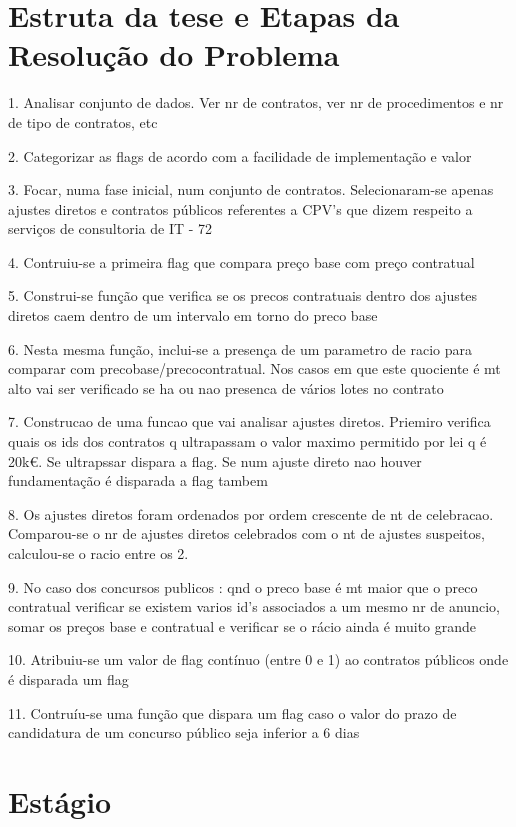 \section{Estruta da tese e   Etapas da Resolução do Problema}

1. Analisar conjunto de dados. Ver nr de contratos, ver nr de procedimentos e nr de tipo de contratos, etc

2. Categorizar as flags de acordo com a facilidade de implementação e valor

3. Focar, numa fase inicial, num conjunto de contratos. Selecionaram-se apenas ajustes diretos e contratos públicos referentes a CPV's que dizem respeito a serviços de consultoria de IT - 72

4. Contruiu-se a primeira flag que compara preço base com preço contratual 

5. Construi-se função que verifica se os precos contratuais dentro dos ajustes diretos caem dentro de um intervalo em torno do preco base

6. Nesta mesma função, inclui-se a presença de um parametro de racio para comparar com precobase/precocontratual. Nos casos em que este quociente é mt alto vai ser verificado se ha ou nao presenca de vários lotes no contrato

7. Construcao de uma funcao que vai analisar ajustes diretos. Priemiro verifica quais os ids dos contratos q ultrapassam o valor maximo permitido por lei q é 20k€. Se ultrapssar dispara a flag. Se num ajuste direto nao houver fundamentação é disparada a flag tambem

8. Os ajustes diretos foram ordenados por ordem crescente de nt de celebracao. Comparou-se o nr de ajustes diretos celebrados com o nt de ajustes suspeitos, calculou-se o racio entre os 2. 

9. No caso dos concursos publicos : qnd o preco base é mt maior que o preco contratual verificar se existem varios id's associados a um mesmo nr de anuncio, somar os preços base e contratual e verificar se o rácio ainda é muito grande

10. Atribuiu-se um valor de flag contínuo (entre 0 e 1) ao contratos públicos onde é disparada um flag

11. Contruíu-se uma função que dispara um flag caso o valor do prazo de candidatura de um concurso público seja inferior a 6 dias


\section{Estágio}

